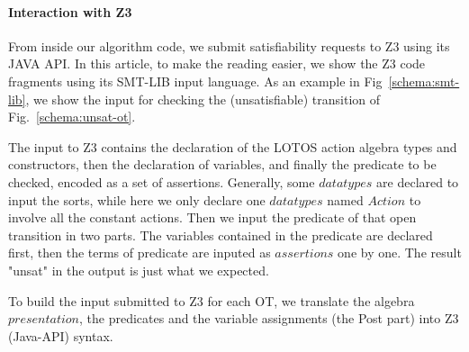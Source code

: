 \documentclass{lncs/llncs}
\newcommand{\TODO}[1]{\textcolor{red}{\textbf{[TODO:#1]}}}
\begin{document}
\paragraph{Interaction with Z3}
From inside our algorithm code, we submit satisfiability requests to
Z3 using its JAVA API. In this article, to make the reading easier, we
show the Z3 code fragments using its SMT-LIB input language. As an
example in
Fig~\ref{schema:smt-lib}, we show the input for checking the (unsatisfiable)
transition of Fig.~\ref{schema:unsat-ot}.

The input to Z3 contains the declaration of the LOTOS action algebra types
and constructors, then the declaration of variables, and finally the
predicate to be checked, encoded as a set of assertions.
Generally, some $datatypes$ are declared to input the sorts, while here
we only declare one $datatypes$ named $Action$ to involve all the
constant actions. Then we input the predicate of that open transition
in two parts. The variables contained in the predicate are declared
first, then the terms of predicate are inputed as $assertions$ one by
one. The result "unsat" in the output is just what we expected.   


%

To build the input submitted to Z3 for each OT,
we translate the algebra $presentation$, the predicates and the
variable assignments (the Post part) into Z3 (Java-API) syntax.
\end{document}
